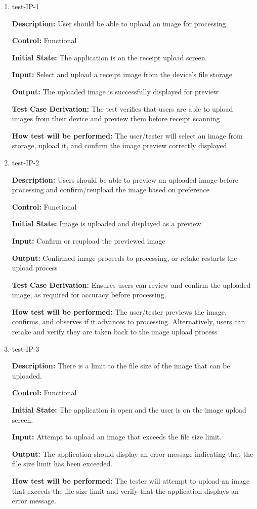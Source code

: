 \documentclass[12pt, titlepage]{article}
\begin{document}
\begin{enumerate}
\item{test-IP-1\\}

\textbf{Description:} User should be able to upload an image for processing

\textbf{Control:} Functional

\textbf{Initial State:} The application is on the receipt upload screen.

\textbf{Input:} Select and upload a receipt image from the device's file storage

\textbf{Output:} The uploaded image is successfully displayed for preview

\textbf{Test Case Derivation:} The test verifies that users are able to upload images from their device and preview them before receipt scanning

\textbf{How test will be performed:} The user/tester will select an image from storage, upload it, and confirm the image preview correctly displayed

\item{test-IP-2\\}

\textbf{Description:} Users should be able to preview an uploaded image before processing and confirm/reupload the image based on preference

\textbf{Control:} Functional

\textbf{Initial State:} Image is uploaded and displayed as a preview.

\textbf{Input:} Confirm or reupload the previewed image

\textbf{Output:} Confirmed image proceeds to processing, or retake restarts the upload process

\textbf{Test Case Derivation:} Ensures users can review and confirm the uploaded image, as required for accuracy before processing.

\textbf{How test will be performed:} The user/tester previews the image, confirms, and observes if it advances to processing. Alternatively, users can retake and verify they are taken back to the image upload process

\item{test-IP-3\\}

\textbf{Description:} There is a limit to the file size of the image that can be
uploaded.

\textbf{Control:} Functional

\textbf{Initial State:} The application is open and the user is on the image
upload screen.

\textbf{Input:} Attempt to upload an image that exceeds the file size limit.

\textbf{Output:} The application should display an error message indicating that
the file size limit has been exceeded.

\textbf{How test will be performed:} The tester will attempt to upload an image
that exceeds the file size limit and verify that the application displays an
error message.



\end{enumerate}
\end{document}
